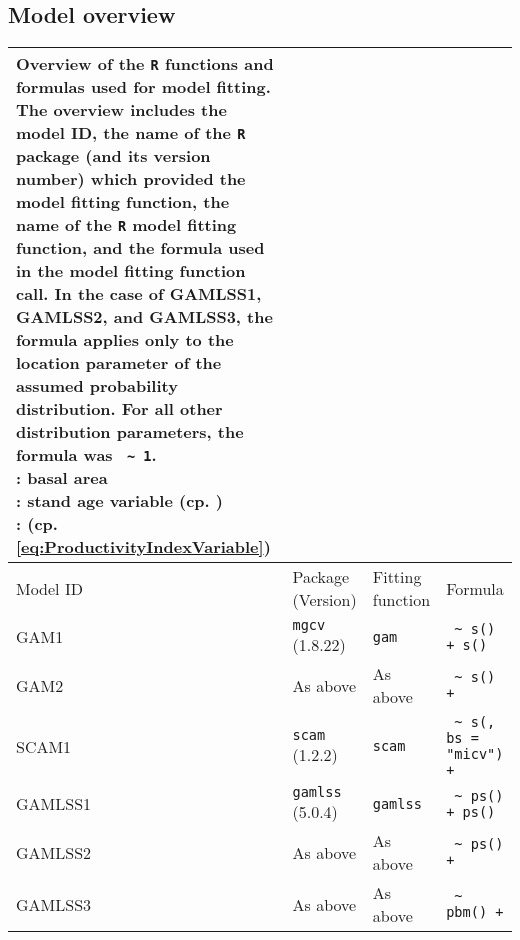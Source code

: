 \subsection{Model overview}

\begin{table}[H]
  {\tabulinesep=2mm
    \begin{longtabu}{L l l l}
      \caption{Overview of the \texttt{R} functions and formulas used for model fitting. The overview includes
        the model ID,
        the name of the \texttt{R} package (and its version number) which provided the model fitting function,
        the name of the \texttt{R} model fitting function,
        and the formula used in the model fitting function call.
        In the case of GAMLSS1, GAMLSS2, and GAMLSS3, the formula applies only to the location parameter of the assumed probability distribution.
        For all other distribution parameters, the formula was \texttt{\BasalAreaR{} \textasciitilde{} 1}. \\
        \BasalAreaR{}: basal area \\
        \StandAgeVariableR{}: stand age variable (cp. ) \\
        \ProductivityIndexVariableR{}: \ProductivityIndexVariableText{} (cp. \eqref{eq:ProductivityIndexVariable})
        \label{tab:PresentedModelsOverviewFormulas}} \\
      \toprule
      Model ID & Package (Version) & Fitting function & Formula \\
      \midrule
      \endhead
      \bottomrule
      \endlastfoot
      GAM1 & \texttt{mgcv} (1.8.22) & \texttt{gam} & \texttt{\BasalAreaR{} \textasciitilde{} s(\StandAgeVariableR{}) + s(\ProductivityIndexVariableR{})} \\
      GAM2 & As above & As above & \texttt{\BasalAreaR{} \textasciitilde{} s(\StandAgeVariableR{}) + \ProductivityIndexVariableR{}} \\
      SCAM1 & \texttt{scam} (1.2.2) & \texttt{scam} & \texttt{\BasalAreaR{} \textasciitilde{} s(\StandAgeVariableR{}, bs = "micv") + \ProductivityIndexVariableR{}} \\
      GAMLSS1 & \texttt{gamlss} (5.0.4) & \texttt{gamlss} & \texttt{\BasalAreaR{} \textasciitilde{} ps(\StandAgeVariableR{}) + ps(\ProductivityIndexVariableR{})} \\
      GAMLSS2 & As above & As above & \texttt{\BasalAreaR{} \textasciitilde{} ps(\StandAgeVariableR{}) + \ProductivityIndexVariableR{}} \\
      GAMLSS3 & As above & As above & \texttt{\BasalAreaR{} \textasciitilde{} pbm(\StandAgeVariableR{}) + \ProductivityIndexVariableR{}} \\
      \bottomrule
    \end{longtabu}}
\end{table}

